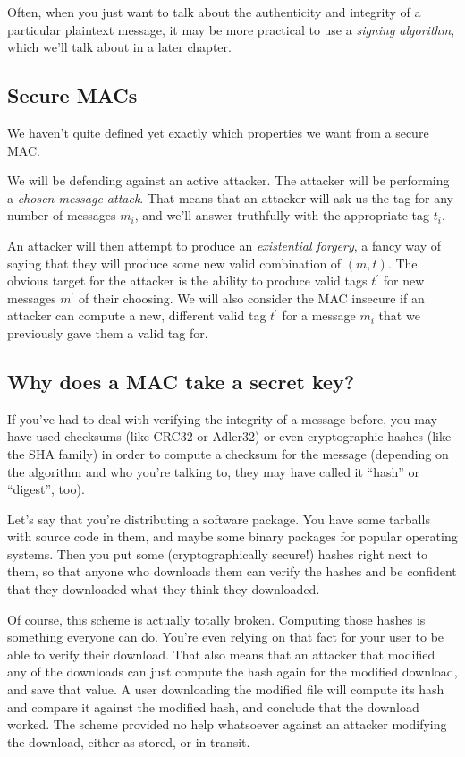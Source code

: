 \documentclass[11pt,ebook,table,dvipsnames]{memoir}
\begin{document}
Often, when you just want to talk about the authenticity and integrity
of a particular plaintext message, it may be more practical to use a
\emph{signing algorithm}, which we'll talk about in a later chapter.

\subsection{Secure MACs}
\label{sec-2-7-1-1}

We haven't quite defined yet exactly which properties we want from a
secure MAC.

We will be defending against an active attacker. The attacker will be
performing a \emph{chosen message attack}. That means that an attacker will
ask us the tag for any number of messages $m_i$, and we'll answer
truthfully with the appropriate tag $t_i$.

An attacker will then attempt to produce an \emph{existential forgery}, a
fancy way of saying that they will produce some new valid combination
of $(m, t)$. The obvious target for the attacker is the ability to
produce valid tags $t^{\prime}$ for new messages $m^{\prime}$ of their
choosing. We will also consider the MAC insecure if an attacker can
compute a new, different valid tag $t^{\prime}$ for a message $m_i$
that we previously gave them a valid tag for.
\subsection{Why does a MAC take a secret key?}
\label{sec-2-7-1-2}

If you've had to deal with verifying the integrity of a message
before, you may have used checksums (like CRC32 or Adler32) or even
cryptographic hashes (like the SHA family) in order to compute a
checksum for the message (depending on the algorithm and who you're
talking to, they may have called it \enquote{hash} or \enquote{digest}, too).

Let's say that you're distributing a software package. You have some
tarballs with source code in them, and maybe some binary packages for
popular operating systems. Then you put some (cryptographically
secure!) hashes right next to them, so that anyone who downloads them
can verify the hashes and be confident that they downloaded what they
think they downloaded.

Of course, this scheme is actually totally broken. Computing those
hashes is something everyone can do. You're even relying on that fact
for your user to be able to verify their download. That also means
that an attacker that modified any of the downloads can just compute
the hash again for the modified download, and save that value. A user
downloading the modified file will compute its hash and compare it
against the modified hash, and conclude that the download worked. The
scheme provided no help whatsoever against an attacker modifying the
download, either as stored, or in transit.
\end{document}
